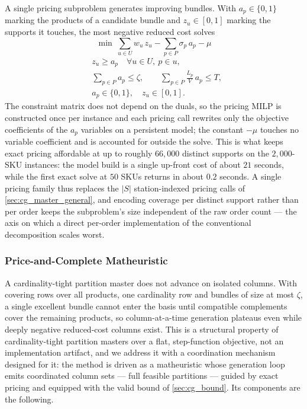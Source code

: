 \documentclass[preprint,review,11pt,authoryear]{elsarticle}
\begin{document}
A single pricing subproblem generates improving bundles. With $a_p \in \{0,1\}$ marking the products of a candidate bundle and $z_u \in [0,1]$ marking the supports it touches, the most negative reduced cost solves
\[
\min\ \sum_{u \in U} w_u\, z_u - \sum_{p \in P} \sigma_p\, a_p - \mu
\]
\begin{align}
    & z_u \ge a_p \quad \forall u \in U,\ p \in u, \nonumber\\
    & \sum_{p \in P} a_p \le \zeta, \qquad \sum_{p \in P} \frac{L_p}{V}\, a_p \le T, \nonumber\\
    & a_p \in \{0,1\}, \quad z_u \in [0,1]. \nonumber
\end{align}
The constraint matrix does not depend on the duals, so the pricing MILP is constructed once per instance and each pricing call rewrites only the objective coefficients of the $a_p$ variables on a persistent model; the constant $-\mu$ touches no variable coefficient and is accounted for outside the solve. This is what keeps exact pricing affordable at up to roughly $66{,}000$ distinct supports on the $2{,}000$-SKU instances: the model build is a single up-front cost of about $21$ seconds, while the first exact solve at $50$ SKUs returns in about $0.2$ seconds. A single pricing family thus replaces the $|S|$ station-indexed pricing calls of \cref{sec:cg_master_general}, and encoding coverage per distinct support rather than per order keeps the subproblem's size independent of the raw order count --- the axis on which a direct per-order implementation of the conventional decomposition scales worst.

\subsubsection{Price-and-Complete Matheuristic}\label{sec:cg_matheuristic}

A cardinality-tight partition master does not advance on isolated columns. With covering rows over all products, one cardinality row and bundles of size at most $\zeta$, a single excellent bundle cannot enter the basis until compatible complements cover the remaining products, so column-at-a-time generation plateaus even while deeply negative reduced-cost columns exist. This is a structural property of cardinality-tight partition masters over a flat, step-function objective, not an implementation artifact, and we address it with a coordination mechanism designed for it: the method is driven as a matheuristic whose generation loop emits coordinated column sets --- full feasible partitions --- guided by exact pricing and equipped with the valid bound of \cref{sec:cg_bound}. Its components are the following.
\end{document}
